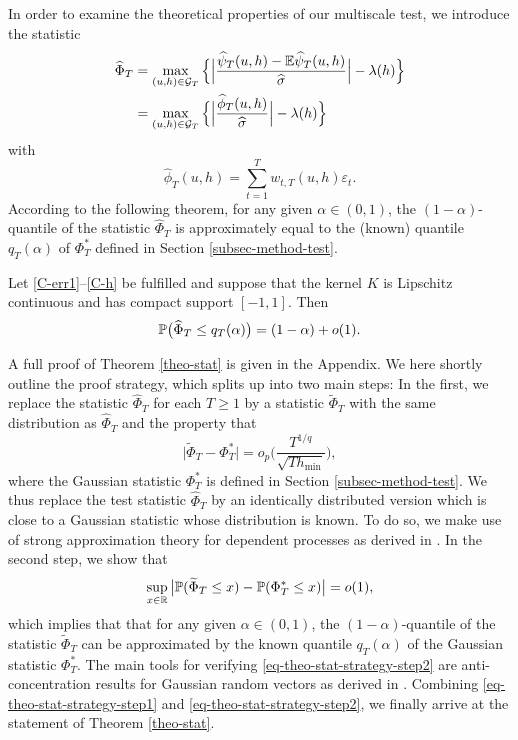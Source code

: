 \documentclass[a4paper,12pt]{article}
\numberwithin{equation}{section}
\begin{document}
In order to examine the theoretical properties of our multiscale test, we introduce the statistic 
\begin{align*}
\widehat{\Phi}_T 
 & = \max_{(u,h) \in \mathcal{G}_T} \Big\{ \Big| \frac{\widehat{\psi}_T(u,h) - \mathbb{E} \widehat{\psi}_T(u,h)}{\widehat{\sigma}} \Big| - \lambda(h) \Big\} \\
 & = \max_{(u,h) \in \mathcal{G}_T} \Big\{ \Big| \frac{\widehat{\phi}_T(u,h)}{\widehat{\sigma}} \Big| - \lambda(h) \Big\} 
\end{align*}
with 
\[ \widehat{\phi}_T(u,h) = \sum\limits_{t=1}^T w_{t,T}(u,h) \varepsilon_t. \]
According to the following theorem, for any given $\alpha \in (0,1)$, the $(1-\alpha)$-quantile of the statistic $\widehat{\Phi}_T$ is approximately equal to the (known) quantile $q_T(\alpha)$ of $\Phi_T^*$ defined in Section \ref{subsec-method-test}. 
\begin{theorem}\label{theo-stat}
Let \ref{C-err1}--\ref{C-h} be fulfilled and suppose that the kernel $K$ is Lipschitz continuous and has compact support $[-1,1]$. Then 
\[ \mathbb{P} \big( \widehat{\Phi}_T \le q_T(\alpha) \big) = (1 - \alpha) + o(1). \]
\end{theorem}
A full proof of Theorem \ref{theo-stat} is given in the Appendix. 
We here shortly outline the proof strategy, which splits up into two main steps: In the first, we replace the statistic $\widehat{\Phi}_T$ for each $T \ge 1$ by a statistic $\widetilde{\Phi}_T$ with the same distribution as $\widehat{\Phi}_T$ and the property that 
\begin{equation}\label{eq-theo-stat-strategy-step1}
\big| \widetilde{\Phi}_T - \Phi_T^* \big| = o_p \Big( \frac{T^{1/q}}{\sqrt{T h_{\min}}} \Big),
\end{equation}
where the Gaussian statistic $\Phi_T^*$ is defined in Section \ref{subsec-method-test}. We thus replace the test statistic $\widehat{\Phi}_T$ by an identically distributed version which is close to a Gaussian statistic whose distribution is known. To do so, we make use of strong approximation theory for dependent processes as derived in \cite{BerkesLiuWu2014}. In the second step, we show that 
\begin{equation}\label{eq-theo-stat-strategy-step2}
\sup_{x \in \mathbb{R}} \big| \mathbb{P}(\widetilde{\Phi}_T \le x) - \mathbb{P}(\Phi_T^* \le x) \big| = o(1), 
\end{equation}
which implies that that for any given $\alpha \in (0,1)$, the $(1-\alpha)$-quantile of the statistic $\widetilde{\Phi}_T$ can be approximated by the known quantile $q_T(\alpha)$ of the Gaussian statistic $\Phi_T^*$. The main tools for verifying \eqref{eq-theo-stat-strategy-step2} are anti-concentration results for Gaussian random vectors as derived in \cite{Chernozhukov2015}. Combining \eqref{eq-theo-stat-strategy-step1} and \eqref{eq-theo-stat-strategy-step2}, we finally arrive at the statement of Theorem \ref{theo-stat}. 
\end{document}
